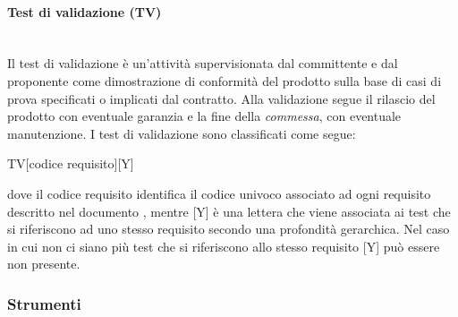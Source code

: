 		\paragraph{Test di validazione (TV)}
		~\\Il test di validazione è un'attività supervisionata dal committente e dal proponente come dimostrazione di conformità del prodotto sulla base 
		di casi di prova specificati o implicati dal contratto.
		Alla validazione segue il rilascio del prodotto con eventuale garanzia e la fine della
		\emph{commessa},	con eventuale manutenzione. I test di validazione sono classificati come segue:
		\begin{center} TV[codice requisito][Y]\end{center}
		dove il codice requisito identifica	il codice univoco associato ad ogni requisito descritto nel documento \AdR, mentre  [Y] è una lettera che viene associata ai test che si riferiscono ad uno stesso requisito secondo una profondità gerarchica. Nel caso in cui non ci siano più test che si riferiscono allo stesso requisito [Y] può essere non presente.
	
	\subsubsection{Strumenti}
